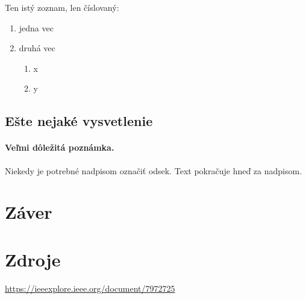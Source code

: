 \documentclass[10pt,twoside,slovak,a4paper]{article}
\begin{document}
Ten istý zoznam, len číslovaný:

\begin{enumerate}
\item jedna vec
\item druhá vec
	\begin{enumerate}
	\item x
	\item y
	\end{enumerate}
\end{enumerate}


\subsection{Ešte nejaké vysvetlenie} \label{ina:este}

\paragraph{Veľmi dôležitá poznámka.}
Niekedy je potrebné nadpisom označiť odsek. Text pokračuje hneď za nadpisom.



\section{Záver} \label{zaver} %



\section{Zdroje}
\url{https://ieeexplore.ieee.org/document/7972725}
%



\end{document}

